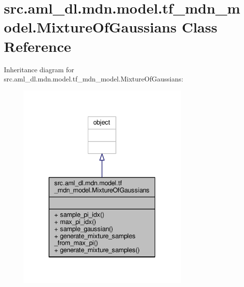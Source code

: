 \hypertarget{classsrc_1_1aml__dl_1_1mdn_1_1model_1_1tf__mdn__model_1_1_mixture_of_gaussians}{\section{src.\-aml\-\_\-dl.\-mdn.\-model.\-tf\-\_\-mdn\-\_\-model.\-Mixture\-Of\-Gaussians Class Reference}
\label{classsrc_1_1aml__dl_1_1mdn_1_1model_1_1tf__mdn__model_1_1_mixture_of_gaussians}
}


Inheritance diagram for src.\-aml\-\_\-dl.\-mdn.\-model.\-tf\-\_\-mdn\-\_\-model.\-Mixture\-Of\-Gaussians\-:
\nopagebreak
\begin{figure}[H]
\begin{center}
\leavevmode
\includegraphics[width=244pt]{classsrc_1_1aml__dl_1_1mdn_1_1model_1_1tf__mdn__model_1_1_mixture_of_gaussians__inherit__graph}
\end{center}
\end{figure}


